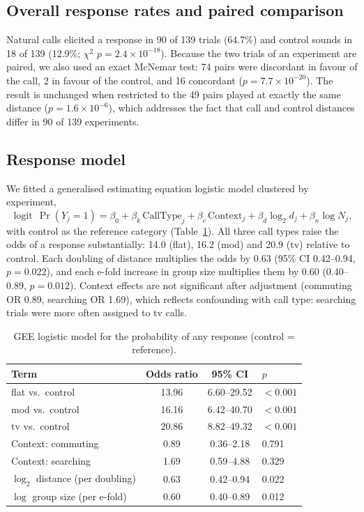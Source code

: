 \documentclass{apmcmthesis}
\begin{document}
\subsection{Overall response rates and paired comparison}
Natural calls elicited a response in 90 of 139 trials (64.7\%) and control sounds in 18 of 139
(12.9\%; $\chi^2$ $p=2.4\times10^{-18}$). Because the two trials of an experiment are paired,
we also used an exact McNemar test: 74 pairs were discordant in favour of the call, 2 in favour
of the control, and 16 concordant ($p=7.7\times10^{-20}$). The result is unchanged when
restricted to the 49 pairs played at exactly the same distance ($p=1.6\times10^{-6}$), which
addresses the fact that call and control distances differ in 90 of 139 experiments.

\subsection{Response model}
We fitted a generalised estimating equation logistic model clustered by experiment,
\begin{equation}
\operatorname{logit}\,\Pr(Y_j=1)=\beta_0+\beta_k\,\mathrm{CallType}_j
+\beta_c\,\mathrm{Context}_j+\beta_d\log_2 d_j+\beta_n\log N_j ,
\end{equation}
with control as the reference category (Table~\ref{tab:gee}). All three call types raise the
odds of a response substantially: 14.0 (flat), 16.2 (mod) and 20.9 (tv) relative to control.
Each doubling of distance multiplies the odds by 0.63 (95\% CI 0.42--0.94, $p=0.022$), and
each e-fold increase in group size multiplies them by 0.60 (0.40--0.89, $p=0.012$). Context
effects are not significant after adjustment (commuting OR 0.89, searching OR 1.69), which
reflects confounding with call type: searching trials were more often assigned to tv calls.

\begin{table}[htbp]
\centering
\caption{GEE logistic model for the probability of any response (control = reference).}
\label{tab:gee}
\small
\begin{tabular}{lccl}
\toprule
Term & Odds ratio & 95\% CI & $p$ \\
\midrule
flat vs.\ control & 13.96 & 6.60--29.52 & $<0.001$ \\
mod vs.\ control & 16.16 & 6.42--40.70 & $<0.001$ \\
tv vs.\ control & 20.86 & 8.82--49.32 & $<0.001$ \\
Context: commuting & 0.89 & 0.36--2.18 & 0.791 \\
Context: searching & 1.69 & 0.59--4.88 & 0.329 \\
$\log_2$ distance (per doubling) & 0.63 & 0.42--0.94 & 0.022 \\
$\log$ group size (per e-fold) & 0.60 & 0.40--0.89 & 0.012 \\
\bottomrule
\end{tabular}
\end{table}
\end{document}
